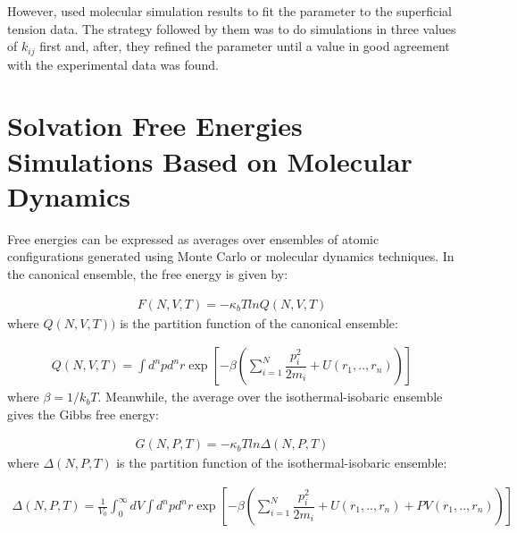 However,  used molecular simulation results to fit the parameter to the superficial tension data. The strategy followed by them was to do simulations in three values of $k_{ij}$ first and, after, they refined the parameter until a value in good agreement with the experimental data was found. 

\section{Solvation Free Energies Simulations Based on Molecular Dynamics}

Free energies can be expressed as averages over ensembles of atomic configurations generated using Monte Carlo or molecular dynamics techniques. In the canonical ensemble, the free energy is given by:  

\begin{equation}
\label{eq:fcano}
\begin{aligned}
F(N,V,T) = -\kappa_{b}T ln Q(N,V,T)
\end{aligned}
\end{equation}
where $Q(N,V,T))$ is the partition function of the canonical ensemble:

\begin{equation}
\label{eq:partican}
\begin{aligned}
Q(N,V,T) = \int d^{n}p d^{n}r \exp \left[ -\beta \left( \sum_{i=1}^{N}\dfrac{p_{i}^{2}}{2m_{i}} + U(r_{1},..,r_{n}) \right)
\right]
\end{aligned}
\end{equation}
where $\beta=1/k_{b}T$. Meanwhile, the average over the isothermal-isobaric ensemble gives the Gibbs free energy:

\begin{equation}
\label{eq:fisobari}
\begin{aligned}
G(N,P,T) = -\kappa_{b}T ln \Delta (N,P,T)
\end{aligned}
\end{equation}
where $\Delta (N,P,T)$ is the partition function of the isothermal-isobaric ensemble:

\begin{equation}
\label{eq:partiso}
\begin{aligned}
\Delta (N,P,T) = \frac{1}{V_{0}} \int_{0}^{\infty} dV \int d^{n}p d^{n}r \exp \left[ -\beta \left( \sum_{i=1}^{N}\dfrac{p_{i}^{2}}{2m_{i}} + U(r_{1},..,r_{n}) + PV(r_{1},..,r_{n}) \right) \right]
\end{aligned}
\end{equation}

